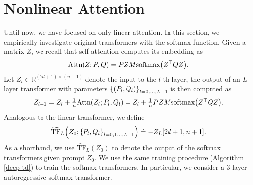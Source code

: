 \documentclass{article}
\newcommand{\R}{\mathbb{R}}
\newcommand{\nattn}{\text{Attn}}
\newcommand{\tf}{\text{TF}}
\newcommand{\ntf}{\widetilde{\tf}}
\newcommand{\softmax}[1]{\text{softmax}\qty(#1)}
\begin{document}
\section{Nonlinear Attention}\label{appendix: nonlinear}
Until now, we have focused on only linear attention.
In this section,
we empirically investigate original transformers with the softmax function.
Given a matrix $Z$, 
we recall that self-attention computes its embedding as
\begin{align}
    \nattn(Z; P, Q) = PZM\softmax{Z^\top Q Z}.
\end{align}
Let $Z_l \in \R^{(2d+1)\times(n+1)}$ denote the input to the $l$-th layer, the output of an $L$-layer transformer with parameters $\qty{(P_l, Q_l)}_{l=0,\dots,L-1}$ is then computed as
\begin{align}
    \textstyle Z_{l+1} = Z_l + \frac{1}{n}\nattn(Z_l; P_l, Q_l)
    = Z_l + \frac{1}{n} PZM\softmax{Z^\top Q Z}.
\end{align}
Analogous to the linear transformer, we define
\begin{align}
\ntf_L \qty(Z_0; \qty{P_l, Q_l}_{l=0,1\dots,L-1}) \doteq -Z_L[2d + 1, n + 1].
\end{align}
As a shorthand, we use $\ntf_L(Z_0)$ to denote the output of the softmax transformers given prompt $Z_0$. 
We use the same training procedure (Algorithm \ref{deep td}) to train the softmax transformers. 
In particular,
we consider a 3-layer autoregressive softmax transformer.
\end{document}
